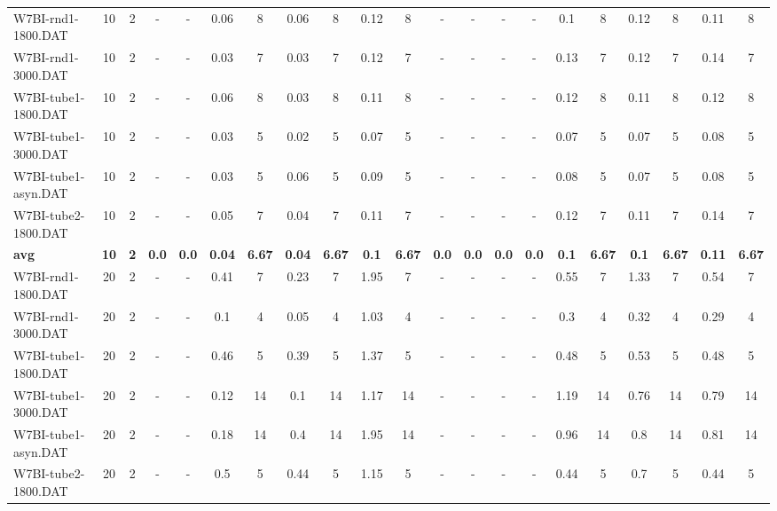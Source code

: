 \begin{sidewaystable}[!ht]
{\begin{tabular}{lcccccccccccccccccccc}
W7BI-rnd1-1800.DAT & 10 & 2 &  - &  - &  \textcolor{blue2}{0.06} & 8 &  \textcolor{blue2}{0.06} & 8 & 0.12 & 8 &  - &  - &  - &  - & 0.1 & 8 & 0.12 & 8 & 0.11 & 8 \\
W7BI-rnd1-3000.DAT & 10 & 2 &  - &  - &  \textcolor{blue2}{0.03} & 7 &  \textcolor{blue2}{0.03} & 7 & 0.12 & 7 &  - &  - &  - &  - & 0.13 & 7 & 0.12 & 7 & 0.14 & 7 \\
W7BI-tube1-1800.DAT & 10 & 2 &  - &  - & 0.06 & 8 &  \textcolor{blue2}{0.03} & 8 & 0.11 & 8 &  - &  - &  - &  - & 0.12 & 8 & 0.11 & 8 & 0.12 & 8 \\
W7BI-tube1-3000.DAT & 10 & 2 &  - &  - & 0.03 & 5 &  \textcolor{blue2}{0.02} & 5 & 0.07 & 5 &  - &  - &  - &  - & 0.07 & 5 & 0.07 & 5 & 0.08 & 5 \\
W7BI-tube1-asyn.DAT & 10 & 2 &  - &  - &  \textcolor{blue2}{0.03} & 5 & 0.06 & 5 & 0.09 & 5 &  - &  - &  - &  - & 0.08 & 5 & 0.07 & 5 & 0.08 & 5 \\
W7BI-tube2-1800.DAT & 10 & 2 &  - &  - & 0.05 & 7 &  \textcolor{blue2}{0.04} & 7 & 0.11 & 7 &  - &  - &  - &  - & 0.12 & 7 & 0.11 & 7 & 0.14 & 7 \\
\cline{1-21} \textbf{avg} & \textbf{10} & \textbf{2} & \textbf{0.0} & \textbf{0.0} & \textbf{0.04} & \textbf{6.67} & \textbf{0.04} & \textbf{6.67} & \textbf{0.1} & \textbf{6.67} & \textbf{0.0} & \textbf{0.0} & \textbf{0.0} & \textbf{0.0} & \textbf{0.1} & \textbf{6.67} & \textbf{0.1} & \textbf{6.67} & \textbf{0.11} & \textbf{6.67} \\ \cline{1-21}
W7BI-rnd1-1800.DAT & 20 & 2 &  - &  - & 0.41 & 7 &  \textcolor{blue2}{0.23} & 7 & 1.95 & 7 &  - &  - &  - &  - & 0.55 & 7 & 1.33 & 7 & 0.54 & 7 \\
W7BI-rnd1-3000.DAT & 20 & 2 &  - &  - & 0.1 & 4 &  \textcolor{blue2}{0.05} & 4 & 1.03 & 4 &  - &  - &  - &  - & 0.3 & 4 & 0.32 & 4 & 0.29 & 4 \\
W7BI-tube1-1800.DAT & 20 & 2 &  - &  - & 0.46 & 5 &  \textcolor{blue2}{0.39} & 5 & 1.37 & 5 &  - &  - &  - &  - & 0.48 & 5 & 0.53 & 5 & 0.48 & 5 \\
W7BI-tube1-3000.DAT & 20 & 2 &  - &  - & 0.12 & 14 &  \textcolor{blue2}{0.1} & 14 & 1.17 & 14 &  - &  - &  - &  - & 1.19 & 14 & 0.76 & 14 & 0.79 & 14 \\
W7BI-tube1-asyn.DAT & 20 & 2 &  - &  - &  \textcolor{blue2}{0.18} & 14 & 0.4 & 14 & 1.95 & 14 &  - &  - &  - &  - & 0.96 & 14 & 0.8 & 14 & 0.81 & 14 \\
W7BI-tube2-1800.DAT & 20 & 2 &  - &  - & 0.5 & 5 &  \textcolor{blue2}{0.44} & 5 & 1.15 & 5 &  - &  - &  - &  - &  \textcolor{blue2}{0.44} & 5 & 0.7 & 5 &  \textcolor{blue2}{0.44} & 5 \\

\end{tabular}}
\end{sidewaystable}
